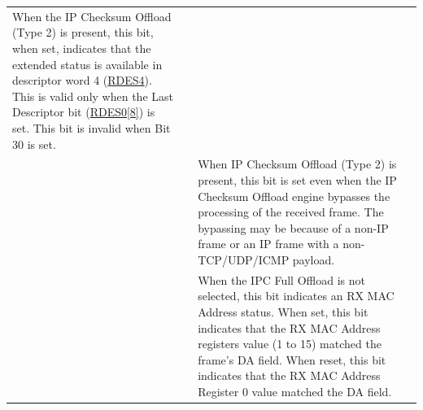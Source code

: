 \documentclass[main\_\_EN.tex]{subfiles}
\begin{document}
\begin{longtable}[c]{ |p{1cm}|p{4cm}|p{10cm}| }
When the IP Checksum Offload (Type 2) is present, this bit, when set, indicates that the extended status is available in descriptor word 4 (\hyperref[tab:ethernetmac-RDES4]{RDES4}). This is valid only when the Last Descriptor bit (\hyperref[tab:ethernetmac-RDES0]{RDES0[8]}) is set. This bit is invalid when Bit 30 is set.\\
& & When IP Checksum Offload (Type 2) is present, this bit is set even when the IP Checksum Offload engine bypasses the processing of the received frame. The bypassing may be because of a non-IP frame or an IP frame with a non-TCP/UDP/ICMP payload.\\
& & When the IPC Full Offload is not selected, this bit indicates an RX MAC Address status. When set, this bit indicates that the RX MAC Address registers value (1 to 15) matched the frame's DA field. When reset, this bit indicates that the RX MAC Address Register 0 value matched the DA field.\\\hline

\end{longtable}
\end{document}
